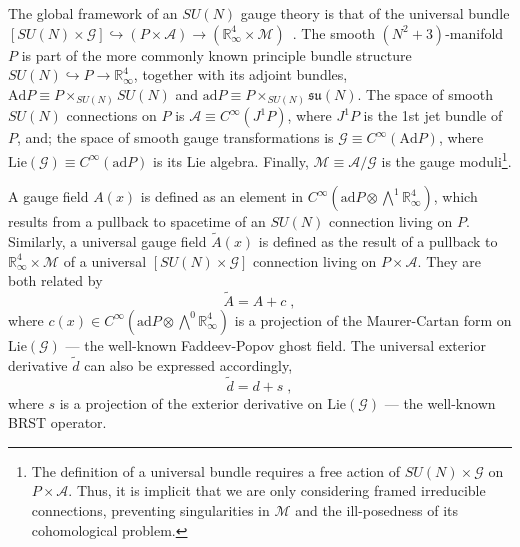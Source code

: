 \documentclass[../main.tex]{subfiles}
\begin{document}
The global framework of an $SU(N)$ gauge theory is that of the universal bundle $[ SU(N)\times\mathcal{G} ] \hookrightarrow ( P \times \mathcal{A} ) \rightarrow ( \mathbb{R}^{4}_{\infty} \times \mathcal{M} )$~\cite{baulieu1985a,baulieu1988a}. The smooth  $(N^2+3)$-manifold $P$ is part of the more commonly known principle bundle structure $SU(N) \hookrightarrow P \rightarrow \mathbb{R}^{4}_{\infty}$, together with its adjoint bundles, $ \mathrm{Ad} P \equiv P \times_{SU(N)} SU(N) $ and $ \mathrm{ad}P \equiv P \times_{SU(N)} \mathfrak{su}(N)$. The space of smooth $SU(N)$ connections on $ P $ is $ \mathcal{A} \equiv C^{ \infty } ( J^1 P ) $, where $ J^1 P $ is the 1st jet bundle of $P$, and; the space of smooth gauge transformations is $ \mathcal{G} \equiv C^{ \infty } ( \mathrm{Ad}P ) $, where $ \mathrm{Lie} (\mathcal{G}) \equiv C^{ \infty } ( \mathrm{ad} P ) $ is its Lie algebra. Finally, $ \mathcal{M} \equiv \mathcal{A}/\mathcal{G}$ is the gauge moduli\footnote{The definition of a universal bundle requires a free action of $SU(N) \times \mathcal{G}$ on $P \times \mathcal{A}$. Thus, it is implicit that we are only considering framed irreducible connections, preventing singularities in $\mathcal{M}$ and the ill-posedness of its cohomological problem.}.

A gauge field $A(x)$ is defined as an element in $C^\infty ( \mathrm{ad}P \otimes \bigwedge^1\mathbb{R}^{4}_{\infty} )$, which results from a pullback to spacetime of an $SU(N)$ connection living on $P$. Similarly, a universal gauge field $\tilde{A}(x)$ is defined as the result of a pullback to $\mathbb{R}^{4}_{\infty} \times \mathcal{M}$ of a universal $[SU(N) \times \mathcal{G}]$ connection living on $P \times \mathcal{A}$. They are both related by
\begin{equation}
  \label{eq:universal-connection}
  \tilde{A} = A + c \;,
\end{equation}
where $c(x) \in C^\infty ( \mathrm{ad}P \otimes \bigwedge^0\mathbb{R}^{4}_{\infty} )$ is a projection of the Maurer-Cartan form on $ \mathrm{ Lie } (\mathcal{G})$ --- the well-known Faddeev-Popov ghost field. The universal exterior derivative $\tilde{d}$ can also be expressed accordingly,
\begin{equation}%
  \label{eq:universal-exterior-derivative}
  \tilde{d} = d + s \;,
\end{equation}
where $s$ is a projection of the exterior derivative on $ \mathrm{Lie} (\mathcal{G})$ --- the well-known BRST operator.
\end{document}
